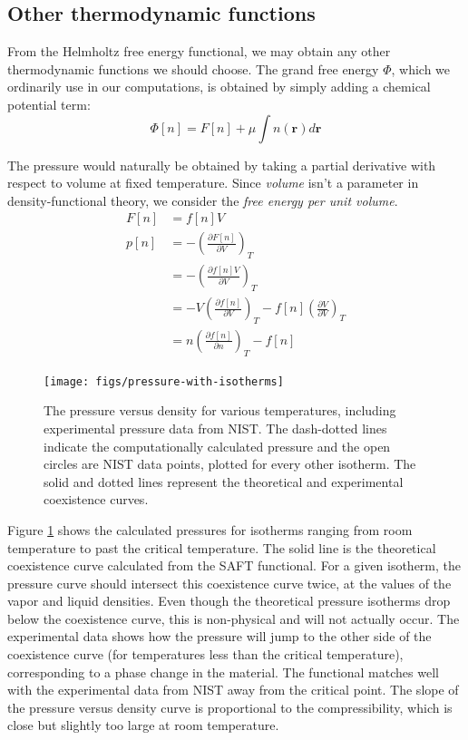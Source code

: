 \documentclass[letterpaper,twocolumn,amsmath,amssymb,prb]{revtex4-1}
\newcommand{\xx}{\textbf{r}}
\begin{document}
\subsection{Other thermodynamic functions}

From the Helmholtz free energy functional, we may obtain any other
thermodynamic functions we should choose.  The grand free energy
$\Phi$, which we ordinarily use in our computations, is obtained by
simply adding a chemical potential term:
\begin{equation}
  \Phi[n] = F[n] + \mu \int n(\xx) d\xx
\end{equation}

The pressure would naturally be obtained by taking a partial
derivative with respect to volume at fixed temperature.  Since
\emph{volume} isn't a parameter in density-functional theory, we
consider the \emph{free energy per unit volume}.
\begin{align}
  F[n] &= f[n]V \\
  p[n] &= -\left(\frac{\partial F[n]}{\partial V}\right)_{T} \\
  &= -\left(\frac{\partial f[n]V}{\partial V}\right)_{T} \\
  &= -V\left(\frac{\partial f[n]}{\partial V}\right)_{T}
   - f[n]\left(\frac{\partial V}{\partial V}\right)_{T} \\
  &= n \left(\frac{\partial f[n]}{\partial n}\right)_{T} - f[n]
\end{align}

\begin{figure}
\begin{center}
\texttt{[image: figs/pressure-with-isotherms]}
\end{center}
\caption{The pressure versus density for various temperatures, including
experimental pressure data from NIST\cite{nistwater}. The dash-dotted lines
indicate the computationally calculated pressure and the open circles are 
NIST data points, plotted for every other isotherm. The solid and dotted lines
represent the theoretical and experimental coexistence curves.}
\label{fig:pressure-with-isotherms}
\end{figure}

Figure \ref{fig:pressure-with-isotherms} shows the calculated pressures for
isotherms ranging from room temperature to past the critical temperature. The
solid line is the theoretical coexistence curve calculated from the SAFT
functional. For a given isotherm, the pressure curve should intersect this
coexistence curve twice, at the values of the vapor and liquid densities. Even
though the theoretical pressure isotherms drop below the coexistence curve,
this is non-physical and will not actually occur. The experimental data shows
how the pressure will jump to the other side of the coexistence curve (for
temperatures less than the critical temperature), corresponding to a phase 
change in the material. The
functional matches well with the experimental data from NIST away from the
critical point. The slope of the pressure versus density curve is proportional
to the compressibility, which is close but slightly too large at room
temperature. 
\end{document}
